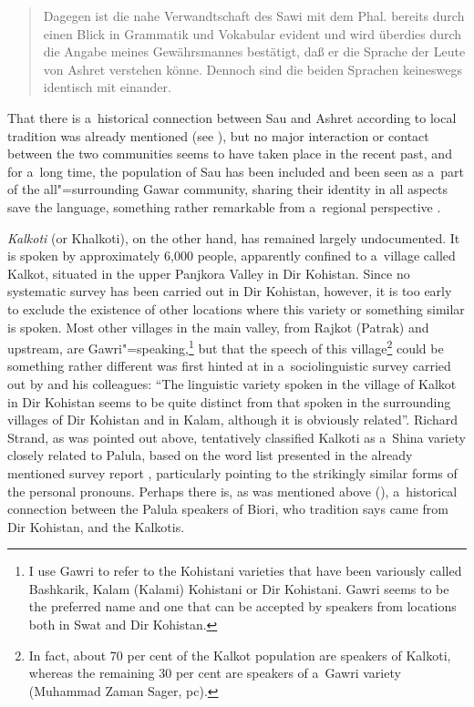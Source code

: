 \begin{quote}
Dagegen ist die nahe Verwandtschaft des Sawi mit dem Phal. bereits durch einen Blick in Grammatik und Vokabular evident und wird überdies durch die Angabe meines Gewährsmannes bestätigt, daß er die Sprache der Leute von Ashret verstehen könne. Dennoch sind die beiden Sprachen keineswegs identisch mit einander. \citep[11]{buddruss1967}
\end{quote}


That there is a~historical connection between Sau and Ashret according to local tradition was
already mentioned (see ), but no major interaction or
contact between the two communities seems to have taken place in the recent past, and for a~long
time, the population of Sau has been included and been seen as a~part of the all"=surrounding Gawar
community, sharing their identity in all aspects save the language, something rather remarkable from
a~regional perspective \citep[232]{cacopardo2001}.


\textit{Kalkoti} (or Khalkoti), on the other hand, has remained largely undocumented. It is spoken by approximately 6,000 people, apparently confined to a~village called Kalkot, situated in the upper Panjkora Valley in Dir Kohistan. Since no systematic survey has been carried out in Dir Kohistan, however, it is too early to exclude the existence of other locations where this variety or something similar is spoken. Most other villages in the main valley, from Rajkot (Patrak) and upstream, are Gawri"=speaking,\footnote{I use Gawri to refer to the Kohistani varieties that have been variously called Bashkarik, Kalam (Kalami) Kohistani or Dir Kohistani. Gawri seems to be the preferred name and one that can be accepted by speakers from locations both in Swat and Dir Kohistan.} but that the speech of this village\footnote{In fact, about 70 per cent of the Kalkot population are speakers of Kalkoti, whereas the remaining 30 per cent are speakers of a~Gawri variety (Muhammad Zaman Sager, pc).} could be something rather different was first hinted at in a~sociolinguistic survey carried out by \citet[7]{rensch1992} and his colleagues: ``The linguistic variety spoken in the village of Kalkot in Dir Kohistan seems to be quite distinct from that spoken in the surrounding villages of Dir Kohistan and in Kalam, although it is obviously related''. Richard Strand, as was pointed out above, tentatively classified Kalkoti as a~Shina variety closely related to Palula, based on the word list presented in the already mentioned survey report \citep[159--176]{rensch1992}, particularly pointing to the strikingly similar forms of the personal pronouns. Perhaps there is, as was mentioned above (), a~historical connection between the Palula speakers of Biori, who tradition says came from Dir Kohistan, and the Kalkotis.


